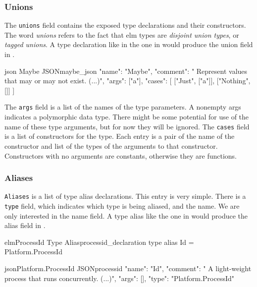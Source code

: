 \documentclass[../thesis.tex]{subfiles}
\begin{document}
\subsubsection{Unions}\label{unions}
The \texttt{unions} field contains the exposed type declarations and their constructors.
The word \textit{unions} refers to the fact that elm types are \textit{disjoint union types}, or \textit{tagged unions}.
A type declaration like in the one in  would produce the union field in .
\begin{code}{ json }{Maybe JSON}{maybe_json}
{
  "name": "Maybe",
  "comment": " Represent values that may or may not exist. (...)",
  "args": ["a"],
  "cases": [
    ["Just", ["a"]],
    ["Nothing", []]
  ]
}
\end{code}
The \texttt{args} field is a list of the names of the type parameters.
A nonempty args indicates a polymorphic data type.
There might be some potential for use of the name of these type arguments, but for now they will be ignored.
The \texttt{cases} field is a list of constructors for the type.
Each entry is a pair of the name of the constructor and list of the types of the arguments to that constructor.
Constructors with no arguments are constants, otherwise they are functions.

\subsubsection{Aliases}\label{aliases}
\texttt{Aliases} is a list of type alias declarations.
This entry is very simple.
There is a \texttt{type} field, which indicates which type is being aliased, and the name.
We are only interested in the name field.
A type alias like the one in 
would produce the alias field in .

\begin{code}{elm}{ProcessId Type Alias}{processid_declaration}
type alias Id = Platform.ProcessId
\end{code}


\begin{code}{json}{Platform.ProcessId JSON}{processid}
{
  "name": "Id",
  "comment": " A light-weight process that runs concurrently. (...)",
  "args": [],
  "type": "Platform.ProcessId"
}
\end{code}
\end{document}
